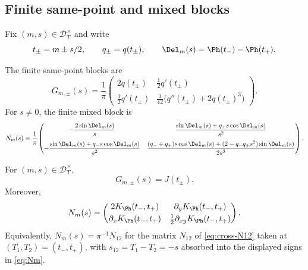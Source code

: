 \subsection{Finite same-point and mixed blocks}
\label{subsec:finite-same-point-and-mixed-blocks}

Fix \((m,s)\in\mathcal D_T^\times\) and write
\[
        t_\pm = m\pm s/2,
        \qquad q_\pm = q(t_\pm),
        \qquad \Del_m(s) = \Ph(t_-)-\Ph(t_+).
\]

\begin{definition}
\label{def:finite-same-point-and-mixed-blocks}
The finite same-point blocks are
\begin{equation}
\label{eq:Gpm}
G_{m,\pm}(s)
=\frac1\pi
\begin{pmatrix}
2q(t_\pm) & \tfrac12 q'(t_\pm)\\[0.8ex]
\tfrac12 q'(t_\pm) & \tfrac1{12}\bigl(q''(t_\pm)+2q(t_\pm)^3\bigr)
\end{pmatrix}.
\end{equation}
For \(s\ne 0\), the finite mixed block is
\begin{equation}
\label{eq:Nm}
N_m(s)
=\frac1\pi
\begin{pmatrix}
-\dfrac{2\sin\Del_m(s)}{s}
&
\dfrac{\sin\Del_m(s)+q_+ s\cos\Del_m(s)}{s^2}
\\[2.4ex]
-\dfrac{\sin\Del_m(s)+q_- s\cos\Del_m(s)}{s^2}
&
\dfrac{(q_-+q_+)s\cos\Del_m(s)+(2-q_- q_+ s^2)\sin\Del_m(s)}{2s^3}
\end{pmatrix}.
\end{equation}
\end{definition}

\begin{lemma}
\label{lem:finite-blocks-exact-interpretation}
For \((m,s)\in\mathcal D_T^\times\),
\[
        G_{m,\pm}(s) = J(t_\pm).
\]
Moreover,
\begin{equation}
\label{eq:Nm-kernel-derivative-form}
N_m(s)
=
\begin{pmatrix}
2K_\Ph(t_-,t_+) & \partial_y K_\Ph(t_-,t_+)\\[0.6ex]
\partial_x K_\Ph(t_-,t_+) & \tfrac12\partial_{xy}K_\Ph(t_-,t_+)
\end{pmatrix}.
\end{equation}
Equivalently, \(N_m(s) = \pi^{-1} N_{12}\) for the matrix \(N_{12}\) of
\eqref{eq:cross-N12} taken at \((T_1, T_2) = (t_-, t_+)\), with
\(s_{12} = T_1 - T_2 = -s\) absorbed into the displayed signs in
\eqref{eq:Nm}.
\end{lemma}

